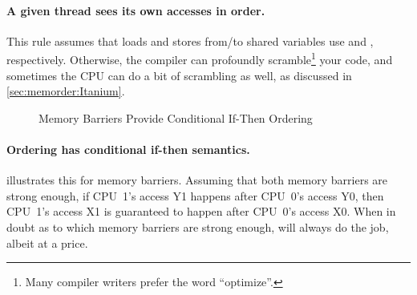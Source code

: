\QuickQuizEnd

\paragraph{A given thread sees its own accesses in order.}
This rule assumes that loads and stores from/to shared variables use
 and , respectively.
Otherwise, the compiler can profoundly scramble\footnote{
	Many compiler writers prefer the word ``optimize''.}
your code, and sometimes the CPU can do a bit of scrambling as well,
as discussed in \cref{sec:memorder:Itanium}.

\begin{figure}
\centering
{}
\caption{Memory Barriers Provide Conditional If-Then Ordering}
\label{fig:memorder:Memory Barriers Provide Conditional If-Then Ordering}
\end{figure}

\paragraph{Ordering has conditional if-then semantics.}
illustrates this for memory barriers.
Assuming that both memory barriers are strong enough, if CPU~1's access
Y1 happens after CPU~0's access Y0, then CPU~1's access X1 is guaranteed
to happen after CPU~0's access X0.
When in doubt as to which memory barriers are strong enough, 
will always do the job, albeit at a price.

